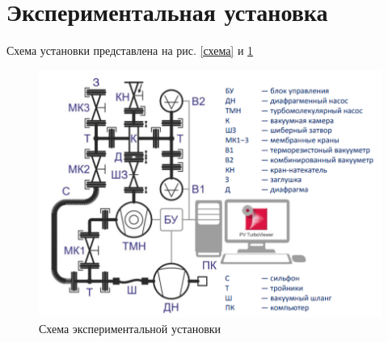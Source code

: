\documentclass[a4paper,12pt]{article} %
\begin{document}
\section{Экспериментальная установка}

Схема установки представлена на рис. \ref{схема} и \ref{схема2}
\begin{figure}[h!]
\begin{center}
\includegraphics[width=\textwidth]{Схема2.png}
\end{center}
\caption{Схема экспериментальной установки} \label{схема2}
\end{figure}
\end{document}
